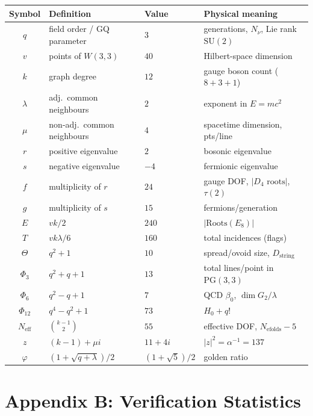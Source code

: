 \documentclass[12pt,a4paper]{article}
\theoremstyle{definition}
\newcommand{\PG}{\mathrm{PG}}
\newcommand{\SU}{\mathrm{SU}}
\newcommand{\Phithree}{\Phi_3}
\newcommand{\Phisix}{\Phi_6}
\newcommand{\Phitwelve}{\Phi_{12}}
\newcommand{\Neff}{N_{\mathrm{eff}}}
\begin{document}
\begin{center}
\small
\begin{tabular}{@{}clll@{}}
\toprule
\textbf{Symbol} & \textbf{Definition} & \textbf{Value}
& \textbf{Physical meaning} \\
\midrule
$q$ & field order / GQ parameter & $3$
& generations, $N_\nu$, Lie rank $\SU(2)$ \\
$v$ & points of $W(3,3)$ & $40$
& Hilbert-space dimension \\
$k$ & graph degree & $12$
& gauge boson count ($8+3+1$) \\
$\lambda$ & adj.\ common neighbours & $2$
& exponent in $E=mc^2$ \\
$\mu$ & non-adj.\ common neighbours & $4$
& spacetime dimension, pts/line \\
$r$ & positive eigenvalue & $2$
& bosonic eigenvalue \\
$s$ & negative eigenvalue & $-4$
& fermionic eigenvalue \\
$f$ & multiplicity of $r$ & $24$
& gauge DOF, $|D_4\text{ roots}|$, $\tau(2)$ \\
$g$ & multiplicity of $s$ & $15$
& fermions/generation \\
$E$ & $vk/2$ & $240$
& $|\mathrm{Roots}(E_8)|$ \\
$T$ & $vk\lambda/6$ & $160$
& total incidences (flags) \\
$\Theta$ & $q^2+1$ & $10$
& spread/ovoid size, $D_{\text{string}}$ \\
$\Phithree$ & $q^2+q+1$ & $13$
& total lines/point in $\PG(3,3)$ \\
$\Phisix$ & $q^2-q+1$ & $7$
& QCD $\beta_0$, $\dim G_2/\lambda$ \\
$\Phitwelve$ & $q^4-q^2+1$ & $73$
& $H_0+q!$ \\
$\Neff$ & $\binom{k-1}{2}$ & $55$
& effective DOF, $N_{\mathrm{efolds}}-5$ \\
$z$ & $(k-1)+\mu i$ & $11+4i$
& $|z|^2=\alpha^{-1}=137$ \\
$\varphi$ & $(1+\sqrt{q+\lambda})/2$ & $(1+\sqrt5)/2$
& golden ratio \\
\bottomrule
\end{tabular}
\end{center}


\section*{Appendix B: Verification Statistics}
\label{app:verification}
\end{document}
